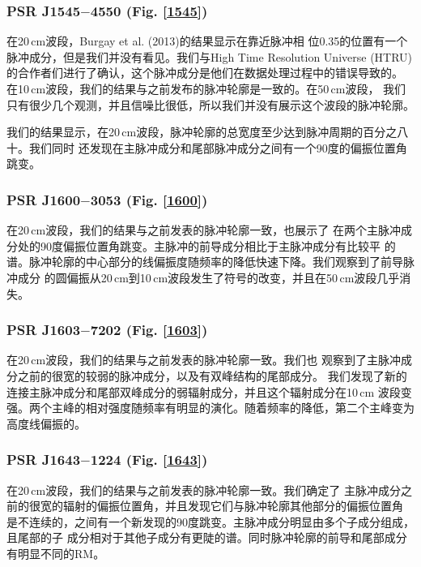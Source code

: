 \subsubsection{PSR J1545$-$4550 (Fig. \ref{1545})}

在20\,cm波段，Burgay et al. (2013)\supercite{Burgay13}的结果显示在靠近脉冲相
位0.35的位置有一个脉冲成分，但是我们并没有看见。我们与High Time Resolution 
Universe (HTRU)的合作者们进行了确认，这个脉冲成分是他们在数据处理过程中的错误导致的。
在10\,cm波段，我们的结果与之前发布的脉冲轮廓是一致的\supercite{Burgay13}。在50\,cm波段，
我们只有很少几个观测，并且信噪比很低，所以我们并没有展示这个波段的脉冲轮廓。

我们的结果显示，在20\,cm波段，脉冲轮廓的总宽度至少达到脉冲周期的百分之八十。我们同时
还发现在主脉冲成分和尾部脉冲成分之间有一个90度的偏振位置角跳变。

\subsubsection{PSR J1600$-$3053 (Fig. \ref{1600})}

在20\,cm波段，我们的结果与之前发表的脉冲轮廓一致\supercite{Ord04,Yan11a}，也展示了
在两个主脉冲成分处的90度偏振位置角跳变。主脉冲的前导成分相比于主脉冲成分有比较平
的谱。脉冲轮廓的中心部分的线偏振度随频率的降低快速下降。我们观察到了前导脉冲成分
的圆偏振从20\,cm到10\,cm波段发生了符号的改变，并且在50\,cm波段几乎消失。

\subsubsection{PSR J1603$-$7202 (Fig. \ref{1603})}

在20\,cm波段，我们的结果与之前发表的脉冲轮廓一致\supercite{Ord04,Yan11a}。我们也
观察到了主脉冲成分之前的很宽的较弱的脉冲成分，以及有双峰结构的尾部成分。
我们发现了新的连接主脉冲成分和尾部双峰成分的弱辐射成分，并且这个辐射成分在10\,cm
波段变强。两个主峰的相对强度随频率有明显的演化。随着频率的降低，第二个主峰变为
高度线偏振的。

\subsubsection{PSR J1643$-$1224 (Fig. \ref{1643})}

在20\,cm波段，我们的结果与之前发表的脉冲轮廓一致\supercite{Ord04,Yan11a}。我们确定了
主脉冲成分之前的很宽的辐射的偏振位置角，并且发现它们与脉冲轮廓其他部分的偏振位置角
是不连续的，之间有一个新发现的90度跳变。主脉冲成分明显由多个子成分组成，且尾部的子
成分相对于其他子成分有更陡的谱。同时脉冲轮廓的前导和尾部成分有明显不同的RM。

